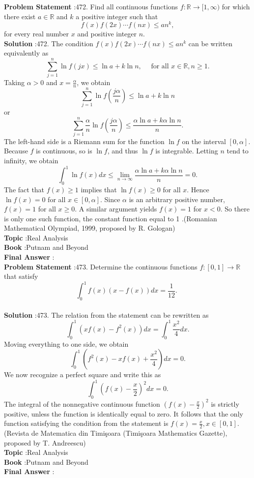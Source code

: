 \documentclass[10pt]{article}
\begin{document}
\textbf{Problem Statement} :472. Find all continuous functions $f: \mathbb{R} \rightarrow[1, \infty)$ for which there exist $a \in \mathbb{R}$ and $k$ a positive integer such that$$ f(x) f(2 x) \cdots f(n x) \leq a n^{k}, $$for every real number $x$ and positive integer $n$. \\
\textbf{Solution} :472. The condition $f(x) f(2 x) \cdots f(n x) \leq a n^{k}$ can be written equivalently as$$ \sum_{j=1}^{n} \ln f(j x) \leq \ln a+k \ln n, \quad \text { for all } x \in \mathbb{R}, n \geq 1 . $$Taking $\alpha>0$ and $x=\frac{\alpha}{n}$, we obtain$$ \sum_{j=1}^{n} \ln f\left(\frac{j \alpha}{n}\right) \leq \ln a+k \ln n $$or$$ \sum_{j=1}^{n} \frac{\alpha}{n} \ln f\left(\frac{j \alpha}{n}\right) \leq \frac{\alpha \ln a+k \alpha \ln n}{n} . $$The left-hand side is a Riemann sum for the function $\ln f$ on the interval $[0, \alpha]$. Because $f$ is continuous, so is $\ln f$, and thus $\ln f$ is integrable. Letting $n$ tend to infinity, we obtain$$ \int_{0}^{1} \ln f(x) d x \leq \lim _{n \rightarrow \infty} \frac{\alpha \ln a+k \alpha \ln n}{n}=0 . $$The fact that $f(x) \geq 1$ implies that $\ln f(x) \geq 0$ for all $x$. Hence $\ln f(x)=0$ for all $x \in[0, \alpha]$. Since $\alpha$ is an arbitrary positive number, $f(x)=1$ for all $x \geq 0$. A similar argument yields $f(x)=1$ for $x<0$. So there is only one such function, the constant function equal to 1 .(Romanian Mathematical Olympiad, 1999, proposed by R. Gologan)\\
\textbf{Topic} :Real Analysis\\
\textbf{Book} :Putnam and Beyond\\
\textbf{Final Answer} :\\


\textbf{Problem Statement} :473. Determine the continuous functions $f:[0,1] \rightarrow \mathbb{R}$ that satisfy$$ \int_{0}^{1} f(x)(x-f(x)) d x=\frac{1}{12} \text {. } $$\\
\textbf{Solution} :473. The relation from the statement can be rewritten as$$ \int_{0}^{1}\left(x f(x)-f^{2}(x)\right) d x=\int_{0}^{1} \frac{x^{2}}{4} d x . $$Moving everything to one side, we obtain$$ \int_{0}^{1}\left(f^{2}(x)-x f(x)+\frac{x^{2}}{4}\right) d x=0 . $$We now recognize a perfect square and write this as$$ \int_{0}^{1}\left(f(x)-\frac{x}{2}\right)^{2} d x=0 . $$The integral of the nonnegative continuous function $\left(f(x)-\frac{x}{2}\right)^{2}$ is strictly positive, unless the function is identically equal to zero. It follows that the only function satisfying the condition from the statement is $f(x)=\frac{x}{2}, x \in[0,1]$.(Revista de Matematica din Timişoara (Timişoara Mathematics Gazette), proposed by T. Andreescu)\\
\textbf{Topic} :Real Analysis\\
\textbf{Book} :Putnam and Beyond\\
\textbf{Final Answer} :\\
\end{document}
